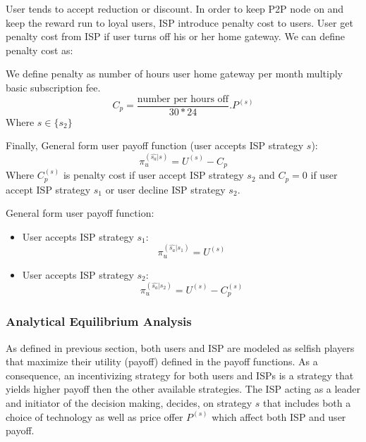 \documentclass[paper]{ieice}
\begin{document}
User tends to accept reduction or discount.   
In order to keep P2P node on and keep the reward run to loyal users, ISP introduce penalty cost to users.
User get penalty cost from ISP if user turns off his or her home gateway.
We can define penalty cost as: 

\newtheorem{theorem7}{Definition}
\begin{theorem}[Penalty]
We define penalty as number of hours user home gateway per month multiply basic subscription fee.
\begin{equation}
	C_p = \frac{\text{number per hours off}}{30*24}.P^{(s)}
\end{equation}
Where $s\in\{s_2\}$
\end{theorem}

Finally, General form user payoff function (user accepts ISP strategy $s$):
\begin{equation}
	\pi^{(\hat{s_a} | s)}_u = U^{(s)} - C_p
\end{equation}
Where $C^{(s)}_{p}$ is penalty cost if user accept ISP strategy $s_2$ and $C_p=0$ if user accept ISP strategy $s_1$ or user decline ISP strategy $s_2$.

General form user payoff function:
\begin{itemize}
	\item User accepts ISP strategy $s_1$: 
	\begin{equation}
		\pi^{(\hat{s_a} | s_1)}_u  = U^{(s)}
	\end{equation}
	\item User accepts ISP strategy $s_2$: 
	\begin{equation}
		\pi^{(\hat{s_a} | s_2)}_u  = U^{(s)} - C^{(s)}_{p}
	\end{equation}
\end{itemize}


\subsubsection{Analytical Equilibrium Analysis}
As defined in previous section, both users and ISP are modeled as selfish players that maximize their utility (payoff) defined in the payoff functions.
As a consequence, an incentivizing strategy for both users and ISPs is a strategy that yields higher payoff then the other available strategies.
The ISP acting as a leader and initiator of the decision making, decides, on strategy $s$ that includes both a choice of technology as well as price offer $P^{(s)}$ which affect both ISP and user payoff.
\end{document}
